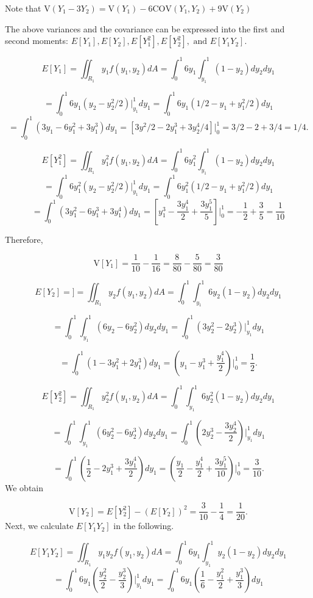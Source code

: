 \documentclass[
]{book}
\begin{document}
Note that \(\text{V}(Y_1-3Y_2) = \text{V}(Y_1) -6\text{COV}(Y_1,Y_2) + 9\text{V}(Y_2)\)

The above variances and the covariance can be expressed into the first and second moments: \(E[Y_1], E[Y_2], E[Y_1^2], E[Y_2^2],\text{ and } E[Y_1Y_2]\).

\[
E[Y_1] = \iint_{R_1} y_1f(y_1,y_2)dA = \int_0^1 6y_1\int_{y_1}^1 (1-y_2)dy_2  dy_1
\]

\[
=\int_0^1 6y_1(y_2-y_2^2/2)\Big|_{y_1}^1dy_1 = \int_0^1 6y_1(1/2-y_1 + y_1^2/2)dy_1
\]
\[
=\int_0^1 (3y_1-6y_1^2 + 3y_1^3)dy_1=\left[ 3y^2/2-2y_1^3+3y_2^4/4\right]\Big|_0^1 = 3/2-2+3/4 = 1/4.
\]

\[
E[Y_1^2] = \iint_{R_1} y_1^2f(y_1,y_2)dA = \int_0^1 6y_1^2\int_{y_1}^1 (1-y_2)dy_2  dy_1
\]
\[
=\int_0^1 6y_1^2(y_2-y_2^2/2)\Big|_{y_1}^1dy_1 =\int_0^1 6y_1^2(1/2-y_1 + y_1^2/2)dy_1
\]
\[
=\int_0^1 (3y_1^2-6y_1^3 + 3y_1^4)dy_1 =\left[y_1^3 -\frac{3y_1^4}{2} +\frac{3y_1^5}{5}\right]\Bigg|_0^1 = -\frac{1}{2} + \frac{3}{5} = \frac{1}{10}
\]

Therefore,

\[
\text{V}[Y_1] = \frac{1}{10}-\frac{1}{16} =  \frac{8}{80}-\frac{5}{80}= \frac{3}{80}
\]

\[
E[Y_2] = ] = \iint_{R_1} y_2f(y_1,y_2)dA = \int_0^1 \int_{y_1}^1 6y_2(1-y_2)dy_2  dy_1
\]

\[
= \int_0^1 \int_{y_1}^1 (6y_2-6y_2^2)dy_2 dy_1 = \int_0^1 (3y_2^2 -2y_2^3)\Bigg|_{y_1}^1 dy_1
\]

\[
=\int_0^1(1-3y_1^2 + 2y_1^3)dy_1 = \left(y_1-y_1^3 + \frac{y_1^4}{2} \right)\Bigg|_0^1 = \frac{1}{2}.
\]

\[
E[Y_2^2] = \iint_{R_1} y_2^2f(y_1,y_2)dA = \int_0^1 \int_{y_1}^1 6y_2^2(1-y_2)dy_2  dy_1
\]

\[
= \int_0^1 \int_{y_1}^1 (6y_2^2-6y_2^3)dy_2 dy_1 = \int_0^1 (2y_2^3 -\frac{3y_2^4}{2})\Bigg|_{y_1}^1 dy_1
\]

\[
=\int_0^1(\frac{1}{2}-2y_1^3 + \frac{3y_1^4}{2})dy_1 = \left(\frac{y_1}{2}-\frac{y_1^4}{2} + \frac{3y_1^5}{10} \right)\Bigg|_0^1 = \frac{3}{10}.
\]
We obtain

\[
\text{V}[Y_2] = E[Y_2^2] - (E[Y_2])^2 = \frac{3}{10} - \frac{1}{4}= \frac{1}{20}. 
\]
Next, we calculate \(E[Y_1Y_2]\) in the following.

\[
E[Y_1Y_2] = \iint_{R_1} y_1y_2f(y_1,y_2)dA = \int_0^1 6y_1\int_{y_1}^1 y_2(1-y_2)dy_2  dy_1
\]
\[
= \int_0^1 6y_1 \left(\frac{y_2^2}{2}-\frac{y_2^3}{3}\right)\Bigg|_{y_1}^1  dy_1=\int_0^1 6y_1\left(\frac{1}{6}  -\frac{y_1^2}{2}+\frac{y_1^3}{3}\right) dy_1
\]
\end{document}
